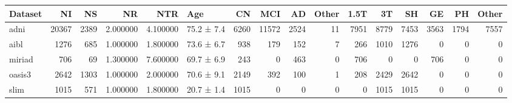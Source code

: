 \begin{tabular}{lrrrrlrrrrrrrrrr}
\toprule
Dataset & NI & NS & NR & NTR & Age & CN & MCI & AD & Other & 1.5T & 3T & SH & GE & PH & Other \\
\midrule
adni & 20367 & 2389 & 2.000000 & 4.100000 & 75.2 ± 7.4 & 6260 & 11572 & 2524 & 11 & 7951 & 8779 & 7453 & 3563 & 1794 & 7557 \\
aibl & 1276 & 685 & 1.000000 & 1.800000 & 73.6 ± 6.7 & 938 & 179 & 152 & 7 & 266 & 1010 & 1276 & 0 & 0 & 0 \\
miriad & 706 & 69 & 1.300000 & 7.600000 & 69.7 ± 6.9 & 243 & 0 & 463 & 0 & 706 & 0 & 0 & 706 & 0 & 0 \\
oasis3 & 2642 & 1303 & 1.000000 & 2.000000 & 70.6 ± 9.1 & 2149 & 392 & 100 & 1 & 208 & 2429 & 2642 & 0 & 0 & 0 \\
slim & 1015 & 571 & 1.000000 & 1.800000 & 20.7 ± 1.4 & 1015 & 0 & 0 & 0 & 0 & 1015 & 1015 & 0 & 0 & 0 \\
\bottomrule
\end{tabular}
